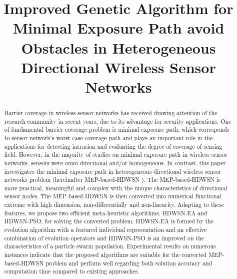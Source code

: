 \documentclass[final]{elsarticle}
\begin{document}
\begin{frontmatter}
\title{Improved Genetic Algorithm for Minimal Exposure Path avoid Obstacles in Heterogeneous Directional Wireless Sensor Networks}

%
%
%
\begin{abstract}
Barrier coverage in wireless sensor networks has received drawing attention of the research community in recent years, due to its advantage for security applications. One of fundamental barrier coverage problem is minimal exposure path, which corresponds to sensor network’s worst-case coverage path and plays an important role in the applications for detecting intrusion and evaluating the degree of coverage of sensing field. However, in the majority of studies on minimal exposure path in wireless sensor networks, sensors were omni-directional and/or homogeneous. In contrast, this paper investigates the minimal exposure path in heterogeneous directional wireless sensor networks problem (hereinafter MEP-based-HDWSN ). The MEP-based-HDWSN is more practical, meaningful and complex with the unique characteristics of directional sensor nodes. The MEP-based-HDWSN is then converted into numerical functional extreme with high dimension, non-differentially and non-linearity. Adapting to these features, we propose two efficient meta-heuristic algorithms, HDWSN-EA and HDWSN-PSO, for solving the converted problem. HDWSN-EA is formed by the evolution algorithm with a featured individual representation and an effective combination of evolution operators and HDWSN-PSO is an improved on the characteristics of a particle swarm population. Experimental results on numerous instances indicate that the proposed algorithms are suitable for the converted MEP-based-HDWSN problem and perform well regarding both solution accuracy and computation time compared to existing approaches.	
  

\end{abstract}
\end{frontmatter}
\end{document}
